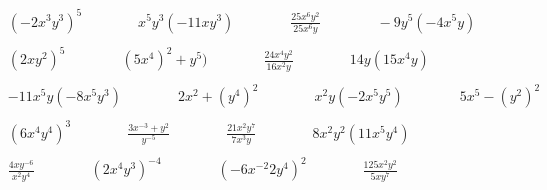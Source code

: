 \documentclass{article}
\begin{document}
\(\begin{aligned}
	&(-2x^3y^3)^5 \qquad\qquad x^5y^3(-11xy^3) \qquad\qquad \frac{25x^6y^2}{25x^6y} \qquad\qquad -9y^5(-4x^5y)\\\\
	&(2xy^2)^5 \qquad\qquad (5x^4)^2+y^5) \qquad\qquad \frac{24x^4y^2}{16x^2y} \qquad\qquad 14y(15x^4y)\\\\
	&-11x^5y(-8x^5y^3) \qquad\qquad 2x^2+(y^4)^2 \qquad\qquad x^2y(-2x^5y^5) \qquad\qquad5x^5-(y^2)^2\\\\
	&(6x^4y^4)^3 \qquad\qquad \frac{3x^{-3}+y^2}{y^{-5}} \qquad\qquad \frac{21x^2y^7}{7x^3y} \qquad\qquad 8x^2y^2(11x^5y^4)\\\\
	&\frac{4xy^{-6}}{x^2y^4} \qquad\qquad (2x^4y^3)^{-4} \qquad\qquad (-6x^{-2}2y^4)^2 \qquad\qquad \frac{125x^2y^2}{5xy^7}\\\\
\end{aligned}\)
\end{document}
